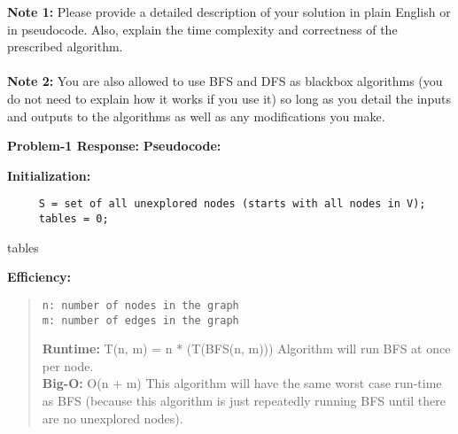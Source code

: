 \documentclass[11pt]{article}
\begin{document}
\noindent
\textbf{Note 1:} Please provide a detailed description of your solution in plain English or in pseudocode. Also, explain the time complexity and correctness of the prescribed algorithm.\\ \\
\textbf{Note 2:} You are also allowed to use BFS and DFS as blackbox algorithms (you do not need to explain how it works if you use it) so long as you detail the inputs and outputs to the algorithms as well as any modifications you make.​

\bigskip
\medskip
\noindent
\textbf{Problem-1 Response:}
\newline \textbf{Pseudocode:}
\begin{algorithm}
 \medskip
 
 \bf{Initialization:}\\
 \begin{verbatim}
     S = set of all unexplored nodes (starts with all nodes in V);
     tables = 0;\end{verbatim}
 \Return tables
\end{algorithm}

\noindent \textbf{Efficiency:}
\begin{quote}
\begin{verbatim}n: number of nodes in the graph
m: number of edges in the graph\end{verbatim}
\medskip

\noindent \textbf{Runtime:} T(n, m) = n * (T(BFS(n, m)))
\newline Algorithm will run BFS at once per node.\\

\noindent \textbf{Big-O:} O(n + m)
\newline This algorithm will have the same worst case run-time as BFS (because this algorithm is just repeatedly running BFS until there are no unexplored nodes).
\end{quote}

\newpage
\end{document}
